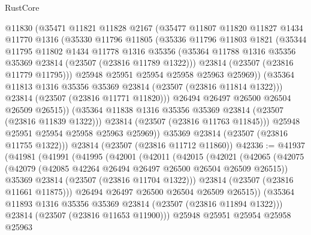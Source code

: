 \begin{lexlean}{RustCore}
\begin{coremodule}
              @11830
              (@35471
                @11821
                @11828
                @2167
                (@35477
                  @11807
                  @11820
                  @11827
                  @1434
                  @11770
                  @1316
                  (@35330
                    @11796
                    @11805
                    (@35336
                      @11796
                      @11803
                      @1821
                      (@35344
                        @11795
                        @11802
                        @1434
                        @11778
                        @1316
                        @35356
                        (@35364 @11788 @1316 @35356 @35369 @23814 (@23507 (@23816 @11789 @1322)))
                        @23814
                        (@23507 (@23816 @11779 @11795)))
                      @25948
                      @25951
                      @25954
                      @25958
                      @25963
                      @25969))
                  (@35364 @11813 @1316 @35356 @35369 @23814 (@23507 (@23816 @11814 @1322)))
                  @23814
                  (@23507 (@23816 @11771 @11820)))
                @26494
                @26497
                @26500
                @26504
                @26509
                @26515))
            (@35364 @11838 @1316 @35356 @35369 @23814 (@23507 (@23816 @11839 @1322)))
            @23814
            (@23507 (@23816 @11763 @11845)))
          @25948
          @25951
          @25954
          @25958
          @25963
          @25969))
      @35369
      @23814
      (@23507 (@23816 @11755 @1322)))
    @23814
    (@23507 (@23816 @11712 @11860))
@42336 := @41937
    (@41981
      (@41991
        (@41995
          (@42001
            (@42011
              (@42015
                (@42021
                  (@42065
                    (@42075
                      (@42079 (@42085 @42264 @26494 @26497 @26500 @26504 @26509 @26515))
                      @35369
                      @23814
                      (@23507 (@23816 @11704 @1322)))
                    @23814
                    (@23507 (@23816 @11661 @11875)))
                  @26494
                  @26497
                  @26500
                  @26504
                  @26509
                  @26515))
              (@35364 @11893 @1316 @35356 @35369 @23814 (@23507 (@23816 @11894 @1322)))
              @23814
              (@23507 (@23816 @11653 @11900)))
            @25948
            @25951
            @25954
            @25958
            @25963

\end{coremodule}
\end{lexlean}
